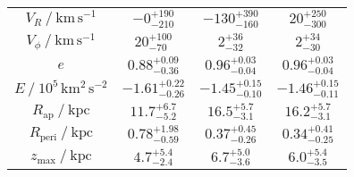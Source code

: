 \begin{table}
\begin{tabular}{cccc}
$V_R~/~\mathrm{km\,s^{-1}}$ & $-0_{-210}^{+190}$ & $-130_{-160}^{+390}$ & $20_{-300}^{+250}$ \\
$V_\phi~/~\mathrm{km\,s^{-1}}$ & $20_{-70}^{+100}$ & $2_{-32}^{+36}$ & $2_{-30}^{+34}$ \\
$e$ & $0.88_{-0.36}^{+0.09}$ & $0.96_{-0.04}^{+0.03}$ & $0.96_{-0.04}^{+0.03}$ \\
$E~/~10^5\,\mathrm{km^{2}\,s^{-2}}$ & $-1.61_{-0.26}^{+0.22}$ & $-1.45_{-0.10}^{+0.15}$ & $-1.46_{-0.11}^{+0.15}$ \\
$R_\text{ap}~/~\mathrm{kpc}$ & $11.7_{-5.2}^{+6.7}$ & $16.5_{-3.1}^{+5.7}$ & $16.2_{-3.1}^{+5.7}$ \\
$R_\text{peri}~/~\mathrm{kpc}$ & $0.78_{-0.59}^{+1.98}$ & $0.37_{-0.26}^{+0.45}$ & $0.34_{-0.25}^{+0.41}$ \\
$z_\text{max}~/~\mathrm{kpc}$ & $4.7_{-2.4}^{+5.4}$ & $6.7_{-3.6}^{+5.0}$ & $6.0_{-3.5}^{+5.4}$ \\
\hline
\end{tabular}
\end{table}
\endgroup
